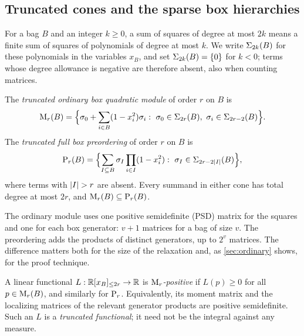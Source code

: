 \subsection{Truncated cones and the sparse box hierarchies}
\label{sec:set-hierarchies}

For a bag $B$ and an integer $k\ge0$, a sum of squares of degree at most
$2k$ means a finite sum of squares of polynomials of degree at most $k$.
We write $\Sigma_{2k}(B)$ for these polynomials in the variables $x_B$, and
set $\Sigma_{2k}(B)=\{0\}$ for $k<0$; terms whose degree allowance is
negative are therefore absent, also when counting matrices.

\begin{definition}\label{def:cones}
The \emph{truncated ordinary box quadratic module} of order $r$ on $B$ is
\[
  \mathrm{M}_r(B)=\Bigl\{\sigma_0+\sum_{i\in B}(1-x_i^2)\sigma_i:\
  \sigma_0\in\Sigma_{2r}(B),\ \sigma_i\in\Sigma_{2r-2}(B)\Bigr\}.
\]
The \emph{truncated full box preordering} of order $r$ on $B$ is
\[
  \mathrm{P}_r(B)=\Bigl\{\sum_{I\subseteq B}\sigma_I\prod_{i\in I}(1-x_i^2):\
  \sigma_I\in\Sigma_{2r-2\lvert I\rvert}(B)\Bigr\},
\]
where terms with $\lvert I\rvert>r$ are absent. Every summand in either cone has
total degree at most $2r$, and $\mathrm{M}_r(B)\subseteq\mathrm{P}_r(B)$.
\end{definition}

The ordinary module uses one positive semidefinite (PSD) matrix for the
squares and one for each box generator: $v+1$ matrices for a bag of size
$v$. The preordering adds the products of distinct generators, up to $2^v$
matrices. The difference matters both for the size of the relaxation and,
as \cref{sec:ordinary} shows, for the proof technique.

A linear functional $L:\mathbb{R}[x_B]_{\le 2r}\to\mathbb{R}$ is \emph{$\mathrm{M}_r$-positive} if
$L(p)\ge0$ for all $p\in\mathrm{M}_r(B)$, and similarly for $\mathrm{P}_r$. Equivalently,
its moment matrix and the localizing matrices of the relevant generator
products are positive semidefinite. Such an $L$ is a \emph{truncated
functional}; it need not be the integral against any measure.

